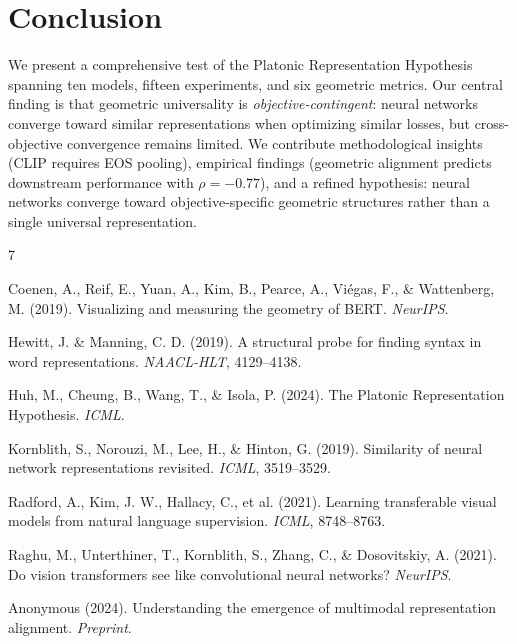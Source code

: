 \documentclass{article}
\begin{document}
\section{Conclusion}

We present a comprehensive test of the Platonic Representation Hypothesis spanning ten models, fifteen experiments, and six geometric metrics. Our central finding is that geometric universality is \emph{objective-contingent}: neural networks converge toward similar representations when optimizing similar losses, but cross-objective convergence remains limited. We contribute methodological insights (CLIP requires EOS pooling), empirical findings (geometric alignment predicts downstream performance with $\rho = -0.77$), and a refined hypothesis: neural networks converge toward objective-specific geometric structures rather than a single universal representation.


\begin{thebibliography}{7}
\small

Coenen, A., Reif, E., Yuan, A., Kim, B., Pearce, A., Vi{\'e}gas, F., \& Wattenberg, M. (2019).
Visualizing and measuring the geometry of BERT.
\textit{NeurIPS}.

Hewitt, J. \& Manning, C. D. (2019).
A structural probe for finding syntax in word representations.
\textit{NAACL-HLT}, 4129--4138.

Huh, M., Cheung, B., Wang, T., \& Isola, P. (2024).
The Platonic Representation Hypothesis.
\textit{ICML}.

Kornblith, S., Norouzi, M., Lee, H., \& Hinton, G. (2019).
Similarity of neural network representations revisited.
\textit{ICML}, 3519--3529.

Radford, A., Kim, J. W., Hallacy, C., et al. (2021).
Learning transferable visual models from natural language supervision.
\textit{ICML}, 8748--8763.

Raghu, M., Unterthiner, T., Kornblith, S., Zhang, C., \& Dosovitskiy, A. (2021).
Do vision transformers see like convolutional neural networks?
\textit{NeurIPS}.

Anonymous (2024).
Understanding the emergence of multimodal representation alignment.
\textit{Preprint}.

\end{thebibliography}
\end{document}
